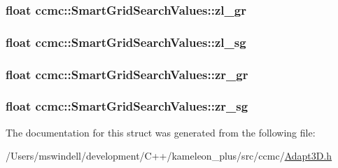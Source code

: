 \hypertarget{structccmc_1_1_smart_grid_search_values_a48282880363f71c4808e1c52b02b3f15}{
\subsubsection[{zl\-\_\-gr}]{\setlength{\rightskip}{0pt plus 5cm}float ccmc\-::\-Smart\-Grid\-Search\-Values\-::zl\-\_\-gr}}\label{structccmc_1_1_smart_grid_search_values_a48282880363f71c4808e1c52b02b3f15}
\hypertarget{structccmc_1_1_smart_grid_search_values_a5fb89265acfd6f65e95d71ae9ddc8a96}{
\subsubsection[{zl\-\_\-sg}]{\setlength{\rightskip}{0pt plus 5cm}float ccmc\-::\-Smart\-Grid\-Search\-Values\-::zl\-\_\-sg}}\label{structccmc_1_1_smart_grid_search_values_a5fb89265acfd6f65e95d71ae9ddc8a96}
\hypertarget{structccmc_1_1_smart_grid_search_values_a8b574711e03c10b054ce85b65123349b}{
\subsubsection[{zr\-\_\-gr}]{\setlength{\rightskip}{0pt plus 5cm}float ccmc\-::\-Smart\-Grid\-Search\-Values\-::zr\-\_\-gr}}\label{structccmc_1_1_smart_grid_search_values_a8b574711e03c10b054ce85b65123349b}
\hypertarget{structccmc_1_1_smart_grid_search_values_aafc8fc1c1fbadae14f2a921f14853189}{
\subsubsection[{zr\-\_\-sg}]{\setlength{\rightskip}{0pt plus 5cm}float ccmc\-::\-Smart\-Grid\-Search\-Values\-::zr\-\_\-sg}}\label{structccmc_1_1_smart_grid_search_values_aafc8fc1c1fbadae14f2a921f14853189}


The documentation for this struct was generated from the following file\-:\begin{DoxyCompactItemize}
\item 
/\-Users/mswindell/development/\-C++/kameleon\-\_\-plus/src/ccmc/\hyperlink{_adapt3_d_8h}{Adapt3\-D.\-h}\end{DoxyCompactItemize}

